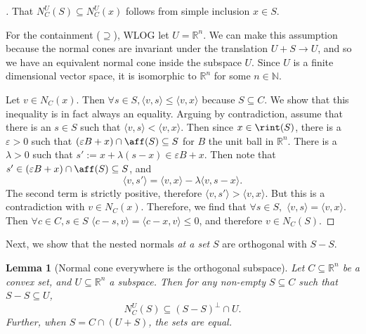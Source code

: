 \documentclass{article}
\theoremstyle{plain}
\newtheorem{lemma}{Lemma}[section]
\theoremstyle{definition}
\theoremstyle{remark}
\begin{document}
\begin{proof}[\hypertarget{loc:normal_cones_in_the_relative_interior_are_representative.proof}Proof of \Cref{loc:normal_cones_in_the_relative_interior_are_representative.statement}]

That $N_C^U(S) \subseteq N_C^U(x)$ follows from simple inclusion $x \in S$.

For the containment ($\supseteq$), WLOG let $U = \mathbb{R}^n$.
We can make this assumption because the normal
cones are invariant under the translation $U + S \to U$,
and so we have an equivalent normal cone inside the subspace $U$. Since $U$
is a finite dimensional vector space, it is isomorphic to $\mathbb{R}^n$
for some $n \in \mathbb{N}$. 

Let $v \in N_C(x)$. Then $\forall s \in S, \langle v, s\rangle \le \langle v, x\rangle$ because $S \subseteq C$. 
We show that this inequality is in fact always an equality.
Arguing by contradiction, assume that there is an $s \in S$ such that $\langle v, s\rangle < \langle v, x\rangle$. Then since $x \in \rint(S)$, there is a $\varepsilon>0$
such that $(\varepsilon B + x) \cap \aff(S) \subseteq S$ for $B$ the unit
ball in $\mathbb{R}^n$. There is
a $\lambda > 0$ such that $s' := x + \lambda(s-x) \in \varepsilon B + x$.
Then note that $s' \in (\varepsilon B + x) \cap \aff(S) \subseteq S$, and
\begin{equation*}
\langle v, s'\rangle =  \langle v, x\rangle - \lambda \langle v, s-x\rangle.
\end{equation*}
The second term is strictly positive, therefore $\langle v, s'\rangle> \langle v, x\rangle$.
But this is a contradiction with $v \in N_C(x)$.
Therefore, we find that $\forall s \in S,$ $\langle v, s\rangle = \langle v, x\rangle$.
Then $\forall c \in C, s \in S$ $\langle c-s, v\rangle =  \langle c-x, v\rangle \le 0$,
and therefore $v \in N_C(S)$.
\end{proof}
Next, we show that the nested normals \emph{at a set} $S$ are orthogonal with $S - S$.
\begin{lemma}[Normal cone everywhere is the orthogonal subspace]
\label{loc:normal_cone_everywhere_is_the_orthogonal_subspace.statement}
Let $C \subseteq \mathbb{R}^n$ be a convex set, and $U \subseteq \mathbb{R}^n$ a subspace. Then for any non-empty $S \subseteq C$ such that $S-S \subseteq U$,
\begin{equation*}
N_C^U(S) \subseteq (S - S)^\perp \cap U.
\end{equation*}
Further, when $S = C \cap (U+S)$, the sets are equal.
\end{lemma}
\end{document}
